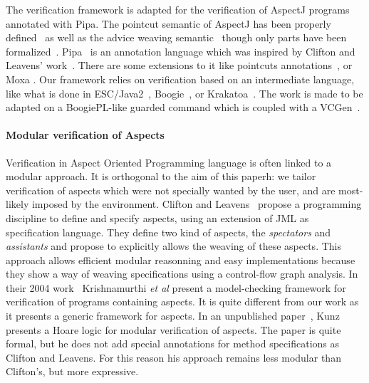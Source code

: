 The verification framework is adapted for the verification of AspectJ
programs annotated with Pipa.  The pointcut semantic of AspectJ has
been properly defined~\cite{DBLP:conf/popl/AvgustinovHOMSTV07} as well
as the advice weaving semantic~\cite{weaving04} though only parts have
been formalized~\cite{weaving06}.  Pipa~\cite{ZhaoR03} is an
annotation language which was inspired by Clifton and Leavens'
work~\cite{clifton02observers}. There are some extensions to it like
pointcuts annotations~\cite{pointcuts07}, or Moxa \cite{moxa05}.  Our
framework relies on verification based on an intermediate language,
like what is done in ESC/Java2~\cite{FlanaganLLNSS02},
Boogie~\cite{BarnettCDJL05}, or Krakatoa~\cite{MarcheP-MU04}. The work
is made to be adapted on a BoogiePL-like guarded command which is
coupled with a VCGen~\cite{BarnettL05,FlanaganS01}.

\paragraph{Modular verification of Aspects}
Verification in Aspect Oriented Programming language is often linked
to a modular approach.  It is orthogonal to the aim of this paperh: we
tailor verification of aspects which were not specially wanted by the
user, and are most-likely imposed by the environment.  Clifton and
Leavens~\cite{clifton02observers,clifton02spectators,cliftonPhd}
propose a programming discipline to define and specify aspects, using
an extension of JML as specification language.  They define two kind
of aspects, the \emph{spectators} and \emph{assistants} and propose to
explicitly allows the weaving of these aspects. This approach allows
efficient modular reasonning and easy implementations because they
show a way of weaving specifications using a control-flow graph
analysis. In their 2004 work~\cite{shriram04} Krishnamurthi {\it et
al} present a model-checking framework for verification of programs
containing aspects. It is quite different from our work as it presents
a generic framework for aspects. In an unpublished paper~\cite{cesar},
Kunz presents a Hoare logic for modular verification of aspects. The
paper is quite formal, but he does not add special annotations for method
specifications as Clifton and Leavens. For this reason his approach remains 
less modular than Clifton's, but more expressive.











